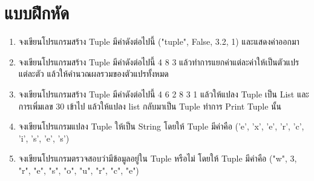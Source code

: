 \section{แบบฝึกหัด}
\begin{enumerate} 
\item 	จงเขียนโปรแกรมสร้าง Tuple มีค่าดังต่อไปนี้ ("tuple", False, 3.2, 1) และแสดงค่าออกมา
\item 	จงเขียนโปรแกรมสร้าง Tuple มีค่าดังต่อไปนี้ 4 8 3 แล้วทำการแยกค่าแต่ละค่าให้เป็นตัวแปรแต่ละตัว แล้วให้คำนวณผลรวมของตัวแปรทั้งหมด
\item 	จงเขียนโปรแกรมสร้าง Tuple มีค่าดังต่อไปนี้ 4 6 2 8 3 1 แล้วให้แปลง Tuple เป็น List และการเพิ่มเลข 30 เข้าไป แล้วให้แปลง list กลับมาเป็น Tuple ทำการ Print Tuple นั้น
\item 	จงเขียนโปรแกรมแปลง Tuple ให้เป็น String โดยให้ Tuple มีค่าคือ ('e', 'x', 'e', 'r', 'c', 'i', 's', 'e', 's')
\item 	จงเขียนโปรแกรมตรวจสอบว่ามีข้อมูลอยู่ใน Tuple หรือไม่ โดยให้ Tuple มีค่าคือ ("w", 3, "r", "e", "s", "o", "u", "r", "c", "e")
\end{enumerate}
